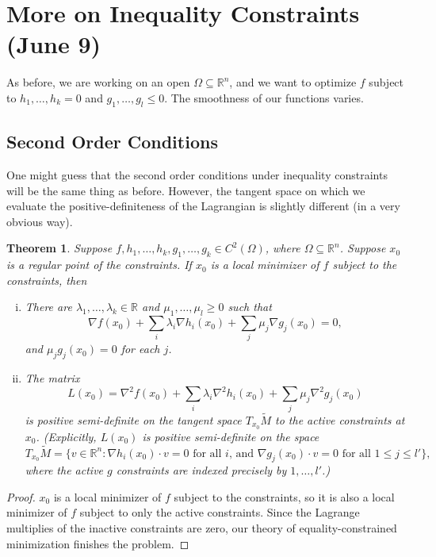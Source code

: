 \documentclass[11pt]{book}
\newcommand{\R}{\mathbb{R}}
\newtheorem{theorem}{Theorem}[subsection]
\begin{document}
\newpage

\section{More on Inequality Constraints (June 9)}

As before, we are working on an open $\Omega \subseteq \R^n$, and we want to optimize $f$ subject to $h_1, \dots, h_k = 0$ and $g_1, \dots, g_l \leq 0$. The smoothness of our functions varies.

\subsection{Second Order Conditions}

One might guess that the second order conditions under inequality constraints will be the same thing as before. However, the tangent space on which we evaluate the positive-definiteness of the Lagrangian is slightly different (in a very obvious way).

\begin{theorem}
Suppose $f, h_1, \dots, h_k, g_1, \dots, g_k \in C^2(\Omega)$, where $\Omega \subseteq \R^n$. Suppose $x_0$ is a regular point of the constraints. If $x_0$ is a local minimizer of $f$ subject to the constraints, then
\begin{enumerate}[(i)]
\item
There are $\lambda_1, \dots, \lambda_k \in \R$ and $\mu_1, \dots, \mu_l \geq 0$ such that
\[
\nabla f(x_0) + \sum_i \lambda_i \nabla h_i(x_0) + \sum_j \mu_j \nabla g_j(x_0) = 0,
\]
and $\mu_j g_j(x_0) = 0$ for each $j$.

\item
The matrix
\[
L(x_0) = \nabla^2 f(x_0) + \sum_i \lambda_i \nabla^2 h_i(x_0) + \sum_j \mu_j \nabla^2 g_j(x_0)
\]
is positive semi-definite on the tangent space $T_{x_0}\tilde{M}$ to the active constraints at $x_0$. (Explicitly, $L(x_0)$ is positive semi-definite on the space
\[
T_{x_0}\tilde{M} = \{v \in \R^n : \nabla h_i(x_0) \cdot v = 0 \text{ for all $i$, and } \nabla g_j(x_0) \cdot v = 0 \text{ for all $1 \leq j \leq l'$}\},
\]
where the active $g$ constraints are indexed precisely by $1, \dots, l'$.)
\end{enumerate}
\end{theorem}
\begin{proof}
$x_0$ is a local minimizer of $f$ subject to the constraints, so it is also a local minimizer of $f$ subject to only the active constraints. Since the Lagrange multiplies of the inactive constraints are zero, our theory of equality-constrained minimization finishes the problem.
\end{proof}
\end{document}
